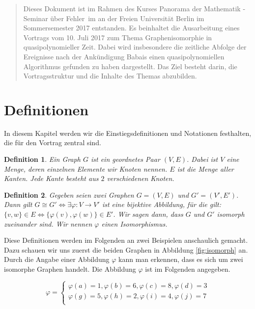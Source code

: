 \documentclass{article}
\newtheorem{definition}{Definition}
\begin{document}
\newpage
\maketitle
\begin{abstract}
Dieses Dokument ist im Rahmen des Kurses \glqq Panorama der Mathematik - Seminar über Fehler\grqq\ im an der Freien Universität Berlin im Sommersemester 2017 entstanden. Es beinhaltet die Ausarbeitung eines Vortrags vom 10. Juli 2017 zum Thema \glqq Graphenisomorphie in quasipolynomieller Zeit\grqq. Dabei wird insbesondere die zeitliche Abfolge der Ereignisse nach der Ankündigung Babais einen quasipolynomiellen Algorithmus gefunden zu haben dargestellt. Das Ziel besteht darin, die Vortragsstruktur und die Inhalte des Themas abzubilden. \end{abstract}

\section{Definitionen}
In diesem Kapitel werden wir die Einstiegsdefinitionen und Notationen festhalten, die für den Vortrag zentral sind.
\begin{definition}
	Ein Graph $G$ ist ein geordnetes Paar $(V, E)$. Dabei ist $V$ eine Menge, deren einzelnen Elemente wir Knoten nennen. $E$ ist die Menge aller Kanten. Jede Kante besteht aus $2$ verschiedenen Knoten.
\end{definition}

\begin{definition}
Gegeben seien zwei Graphen $G = (V,E)$ und $G' = (V',E')$. Dann gilt $G\cong G' \Leftrightarrow \exists \varphi:V\rightarrow V'$ ist eine bijektive Abbildung, für die gilt: $\{v,w\}\in E \Leftrightarrow \{\varphi(v),\varphi(w)\}\in E'$. Wir sagen dann, dass $G$ und $G'$ isomorph zueinander sind. Wir nennen $\varphi$ einen Isomorphismus.
\end{definition}

Diese Definitionen werden im Folgenden an zwei Beispielen anschaulich gemacht. Dazu schauen wir uns zuerst die beiden Graphen in Abbildung \ref{fig:isomorph} an. Durch die Angabe einer Abbildung $\varphi$ kann man erkennen, dass es sich um zwei isomorphe Graphen handelt. Die Abbildung $\varphi$ ist im Folgenden angegeben.

$$\varphi =
    \begin{cases}
    \varphi(a) = 1, \varphi(b) = 6,
    \varphi(c) = 8, \varphi(d) = 3\\
    \varphi(g) = 5, \varphi(h) = 2,
    \varphi(i) = 4, \varphi(j) = 7\\
    \end{cases}  
$$
\end{document}
